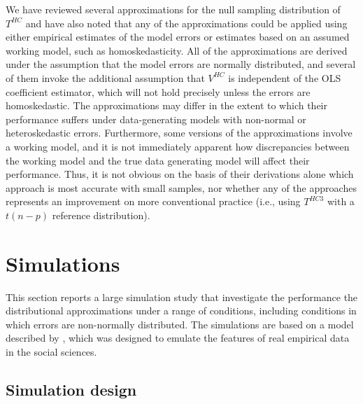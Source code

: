 \documentclass[12pt]{article}\usepackage[]{graphicx}\usepackage[]{color}
\begin{document}
We have reviewed several approximations for the null sampling distribution of $T^{HC}$ and have also noted that any of the approximations could be applied using either empirical estimates of the model errors or estimates based on an assumed working model, such as homoskedasticity.
All of the approximations are derived under the assumption that the model errors are normally distributed, and several of them invoke the additional assumption that $V^{HC}$ is independent of the OLS coefficient estimator, which will not hold precisely unless the errors are homoskedastic. 
The approximations may differ in the extent to which their performance suffers under data-generating models with non-normal or heteroskedastic errors.
Furthermore, some versions of the approximations involve a working model, and it is not immediately apparent how discrepancies between the working model and the true data generating model will affect their performance. 
Thus, it is not obvious on the basis of their derivations alone which approach is most accurate with small samples, nor whether any of the approaches represents an improvement on more conventional practice (i.e., using $T^{HC3}$ with a $t(n - p)$ reference distribution).

\section{Simulations}
\label{sec:simulations}

This section reports a large simulation study that investigate the performance the distributional approximations under a range of conditions, including conditions in which errors are non-normally distributed. The simulations are based on a model described by \citet{Long2000using}, which was designed to emulate the features of real empirical data in the social sciences.

\subsection{Simulation design}
\end{document}
